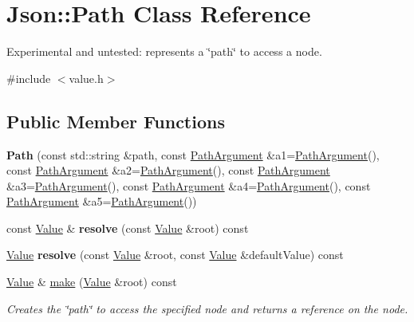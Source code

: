 \hypertarget{class_json_1_1_path}{\section{Json\+:\+:Path Class Reference}
\label{class_json_1_1_path}
}


Experimental and untested\+: represents a \char`\"{}path\char`\"{} to access a node.  




{\ttfamily \#include $<$value.\+h$>$}

\subsection*{Public Member Functions}
\begin{DoxyCompactItemize}
\item 
\hypertarget{class_json_1_1_path_aaa37a99650e770d0cd680bf53585ec99}{{\bfseries Path} (const std\+::string \&path, const \hyperlink{class_json_1_1_path_argument}{Path\+Argument} \&a1=\hyperlink{class_json_1_1_path_argument}{Path\+Argument}(), const \hyperlink{class_json_1_1_path_argument}{Path\+Argument} \&a2=\hyperlink{class_json_1_1_path_argument}{Path\+Argument}(), const \hyperlink{class_json_1_1_path_argument}{Path\+Argument} \&a3=\hyperlink{class_json_1_1_path_argument}{Path\+Argument}(), const \hyperlink{class_json_1_1_path_argument}{Path\+Argument} \&a4=\hyperlink{class_json_1_1_path_argument}{Path\+Argument}(), const \hyperlink{class_json_1_1_path_argument}{Path\+Argument} \&a5=\hyperlink{class_json_1_1_path_argument}{Path\+Argument}())}\label{class_json_1_1_path_aaa37a99650e770d0cd680bf53585ec99}

\item 
\hypertarget{class_json_1_1_path_ae1d05fa985a6ee3c57f2b8ed186b5982}{const \hyperlink{class_json_1_1_value}{Value} \& {\bfseries resolve} (const \hyperlink{class_json_1_1_value}{Value} \&root) const }\label{class_json_1_1_path_ae1d05fa985a6ee3c57f2b8ed186b5982}

\item 
\hypertarget{class_json_1_1_path_a33d1749770a4cf74e9a3de419bc7febe}{\hyperlink{class_json_1_1_value}{Value} {\bfseries resolve} (const \hyperlink{class_json_1_1_value}{Value} \&root, const \hyperlink{class_json_1_1_value}{Value} \&default\+Value) const }\label{class_json_1_1_path_a33d1749770a4cf74e9a3de419bc7febe}

\item 
\hypertarget{class_json_1_1_path_a5289901fc58ad1fdca1de7fb5a0b620c}{\hyperlink{class_json_1_1_value}{Value} \& \hyperlink{class_json_1_1_path_a5289901fc58ad1fdca1de7fb5a0b620c}{make} (\hyperlink{class_json_1_1_value}{Value} \&root) const }\label{class_json_1_1_path_a5289901fc58ad1fdca1de7fb5a0b620c}

\begin{DoxyCompactList}\small\item\em Creates the \char`\"{}path\char`\"{} to access the specified node and returns a reference on the node. \end{DoxyCompactList}\end{DoxyCompactItemize}


